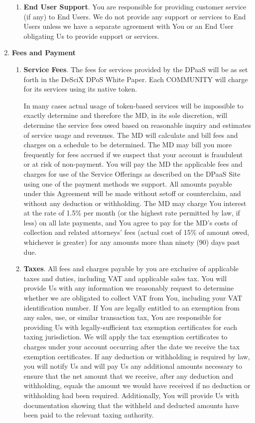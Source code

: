 \documentclass{article}
\begin{document}
\begin{enumerate}
\begin{enumerate}
        \item \textbf{End User Support}. You are responsible for providing customer service (if any) to End Users. We do not provide any support or services to End Users unless we have a separate agreement with You or an End User obligating Us to provide support or services.
    \end{enumerate}

    \item \textbf{Fees and Payment}

    \begin{enumerate}
        \item \textbf{Service Fees}. The fees for services provided by the DPaaS will be as set forth in the DeSciX DPoS White Paper. Each COMMUNITY will charge for its services using its native token.

        In many cases actual usage of token-based services will be impossible to exactly determine and therefore the MD, in its sole discretion, will determine the service fees owed based on reasonable inquiry and estimates of service usage and revenues. The MD will calculate and bill fees and charges on a schedule to be determined. The MD may bill you more frequently for fees accrued if we suspect that your account is fraudulent or at risk of non-payment. You will pay the MD the applicable fees and charges for use of the Service Offerings as described on the DPaaS Site using one of the payment methods we support. All amounts payable under this Agreement will be made without setoff or counterclaim, and without any deduction or withholding. The MD may charge You interest at the rate of 1.5\% per month (or the highest rate permitted by law, if less) on all late payments, and You agree to pay for the MD's costs of collection and related attorneys’ fees (actual cost of 15\% of amount owed, whichever is greater) for any amounts more than ninety (90) days past due.
        
        \item \textbf{Taxes}. All fees and charges payable by you are exclusive of applicable taxes and duties, including VAT and applicable sales tax. You will provide Us with any information we reasonably request to determine whether we are obligated to collect VAT from You, including your VAT identification number. If You are legally entitled to an exemption from any sales, use, or similar transaction tax, You are responsible for providing Us with legally-sufficient tax exemption certificates for each taxing jurisdiction. We will apply the tax exemption certificates to charges under your account occurring after the date we receive the tax exemption certificates. If any deduction or withholding is required by law, you will notify Us and will pay Us any additional amounts necessary to ensure that the net amount that we receive, after any deduction and withholding, equals the amount we would have received if no deduction or withholding had been required. Additionally, You will provide Us with documentation showing that the withheld and deducted amounts have been paid to the relevant taxing authority.
        

\end{enumerate}
\end{enumerate}
\end{document}
